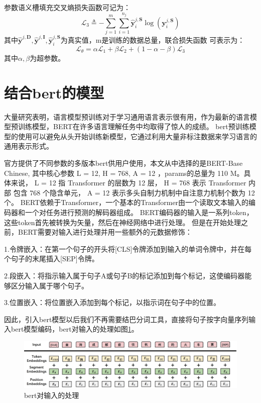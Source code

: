   参数语义槽填充交叉熵损失函数可记为：
  \begin{equation}
    \mathcal{L}_{3} \triangleq-\sum_{j=1}^{m} \sum_{i=1}^{n_{j}} \hat{\mathbf{y}}_{i}^{j, \mathbf{S}} \log \left(\mathbf{y}_{i}^{j, \mathbf{S}}\right)
  \end{equation}
  其中$\hat{\mathbf{y}}^{j, \mathbf{D}},\hat{\mathbf{y}}^{j, \mathbf{I}},\hat{\mathbf{y}}_{i}^{j, \mathbf{S}}$为真实值，m是训练的数据总量，联合损失函数
  可表示为：
  \begin{equation}
    \mathcal{L}_{\theta}=\alpha \mathcal{L}_{1}+\beta \mathcal{L}_{2}+(1-\alpha-\beta) \mathcal{L}_{3}
  \end{equation}
  其中$\alpha,\beta$为超参数。

\section{结合bert的模型}

大量研究表明，语言模型预训练对于学习通用语言表示很有用，作为最新的语言模型预训练模型，BERT在许多语言理解任务中均取得了惊人的成绩。
bert预训练模型的使用可以避免从头开始训练新模型，它通过利用大量非标注数据来学习语言的通用表示形式。

官方提供了不同参数的多版本bert供用户使用，本文从中选择的是BERT-Base Chinese,
其中核心参数 L = 12, H = 768, A = 12 ，params的总量为 110 M。具体来说， L = 12 指 Transformer 的层数为 12 层，
 H = 768 表示 Transformer 内部 包含 768 个隐含单元， A = 12 表示多头自制力机制中自注意力机制个数为 12 个\cite{devlin2018bert}。
 BERT依赖于Transformer，一个基本的Transformer由一个读取文本输入的编码器和一个对任务进行预测的解码器组成。
BERT编码器的输入是一系列token，这些token首先被转换为矢量，然后在神经网络中进行处理。
但是在开始处理之前，BERT需要对输入进行处理并用一些额外的元数据修饰：

1.令牌嵌入：在第一个句子的开头将[CLS]令牌添加到输入的单词令牌中，并在每个句子的末尾插入[SEP]令牌。

2.段嵌入：将指示输入属于句子A或句子B的标记添加到每个标记，这使编码器能够区分输入属于哪个句子。

3.位置嵌入：将位置嵌入添加到每个标记，以指示词在句子中的位置。

因此，引入bert模型以后我们不再需要结巴分词工具，直接将句子按字向量序列输入bert模型编码，bert对输入的处理如图\ref{fig:bertInput}。
\begin{figure}[htbp]
  \centering
  \includegraphics[width=18cm]{./images/bertInput.jpg}
  \caption{bert对输入的处理}
  \label{fig:bertInput}
\end{figure}

